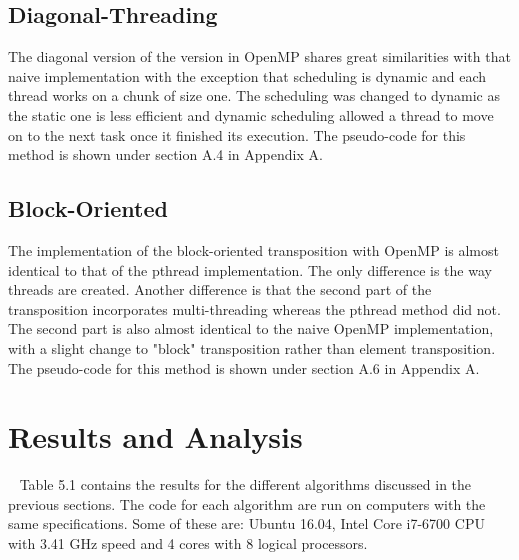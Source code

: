 \documentclass[10pt,journal]{article}
\begin{document}
\subsection{Diagonal-Threading}
The diagonal version of the version in OpenMP shares great similarities with that naive implementation with the exception that scheduling is dynamic and each thread works on a chunk of size one. The scheduling was changed to dynamic as the static one is less efficient and dynamic scheduling allowed a thread to move on to the next task once it finished its execution. The pseudo-code for this method is shown under section A.4 in Appendix A. 

\subsection{Block-Oriented}
The implementation of the block-oriented transposition with OpenMP is almost identical to that of the pthread implementation. The only difference is the way threads are created. Another difference is that the second part of the transposition incorporates multi-threading whereas the pthread method did not. The second part is also almost identical to the naive OpenMP implementation, with a slight change to "block" transposition rather than element transposition. The pseudo-code for this method is shown under section A.6 in Appendix A. 

\section{Results and Analysis}\
Table 5.1 contains the results for the different algorithms discussed in the previous sections. The code for each algorithm are run on computers with the same specifications. Some of these are: Ubuntu 16.04, Intel Core i7-6700 CPU with 3.41 GHz speed and 4 cores with 8 logical processors.
\end{document}
